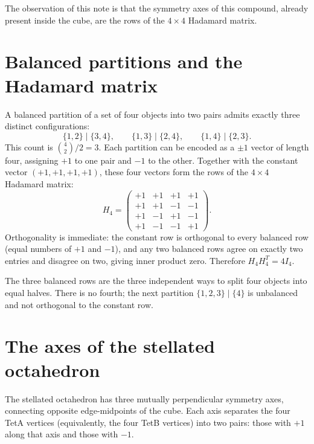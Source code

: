 \documentclass[11pt]{article}
\begin{document}
The observation of this note is that the symmetry axes of this
compound, already present inside the cube, are the rows of the
$4\times 4$ Hadamard matrix.


\section{Balanced partitions and the Hadamard matrix}

A balanced partition of a set of four objects into two pairs
admits exactly three distinct configurations:
\[
\{1,2\}\mid\{3,4\},\qquad
\{1,3\}\mid\{2,4\},\qquad
\{1,4\}\mid\{2,3\}.
\]
This count is $\binom{4}{2}/2=3$.  Each partition can be encoded
as a $\pm1$ vector of length four, assigning $+1$ to one pair and
$-1$ to the other.  Together with the constant vector
$(+1,+1,+1,+1)$, these four vectors form the rows of the
$4\times 4$ Hadamard matrix:
\[
H_4 = \begin{pmatrix}
+1 & +1 & +1 & +1 \\
+1 & +1 & -1 & -1 \\
+1 & -1 & +1 & -1 \\
+1 & -1 & -1 & +1
\end{pmatrix}.
\]
Orthogonality is immediate: the constant row is orthogonal to
every balanced row (equal numbers of $+1$ and $-1$), and any two
balanced rows agree on exactly two entries and disagree on two,
giving inner product zero.  Therefore $H_4 H_4^T = 4I_4$.

The three balanced rows are the three independent ways to split
four objects into equal halves.  There is no fourth; the next
partition $\{1,2,3\}\mid\{4\}$ is unbalanced and not orthogonal
to the constant row.


\section{The axes of the stellated octahedron}

The stellated octahedron has three mutually perpendicular symmetry
axes, connecting opposite edge-midpoints of the cube.  Each axis
separates the four TetA vertices (equivalently, the four TetB
vertices) into two pairs: those with $+1$ along that axis and
those with $-1$.
\end{document}
